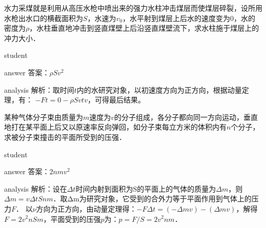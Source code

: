 \begin{example}
	水力采煤就是利用从高压水枪中喷出来的强力水柱冲击煤层而使煤层碎裂，设所用水枪出水口的横截面积为$ S $，水速为$ v_0 $，水平射到煤层上后水的速度变为0，水的密度为$ \rho $，水柱垂直地冲击到竖直煤壁上后沿竖直煤壁流下，求水柱施于煤层上的冲力大小．
	
	\begin{taggedblock}{student}
		\vspace*{1cm}
	\end{taggedblock}
	
	
	\begin{taggedblock}{answer}
		答案：$ \rho S v^2 $
	\end{taggedblock}
	
	
	\begin{taggedblock}{analysis}
		解析：取时间$ t $内的水研究对象，以初速度方向为正方向，根据动量定理，有： $-Ft=0-\rho S v t v$，可得最后结果。
		
	\end{taggedblock}
\end{example}


\begin{example}
	某种气体分子束由质量为$ m $速度为$ v $的分子组成，各分子都向同一方向运动，垂直地打在某平面上后又以原速率反向弹回，如分子束每立方米的体积内有$ n $个分子，求被分子束撞击的平面所受到的压强．
	
	\begin{taggedblock}{student}
		\vspace*{2cm}
	\end{taggedblock}
	
	
	\begin{taggedblock}{answer}
		答案：$ 2nmv^2 $
	\end{taggedblock}
	
	
	\begin{taggedblock}{analysis}
		解析：设在$ \Delta t $时间内射到面积为S的平面上的气体的质量为$ \Delta m $，则$ \Delta m=v\Delta tSnm $．取Δm为研究对象，它受到的合外力等于平面作用到气体上的压力$ F $．
		以$ ν $方向为正方向，由动量定理得：$ -F\Delta t=(-\Delta mv)-(\Delta mv) $，解得$ F=2v^2 nSm $，平面受到的压强$ p $为：$ p=F/S=2v^2 nm $．
	
		
	\end{taggedblock}
\end{example}


